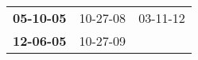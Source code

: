 \begin{supertabular}{p{0.33\columnwidth}p{0.33\columnwidth}p{0.33\columnwidth}}
 \textbf{05-10-05\textsuperscript{}} &  10-27-08\textsuperscript{} &  03-11-12\textsuperscript{} \\
 \textbf{12-06-05\textsuperscript{}} &  10-27-09\textsuperscript{} &                             \\
\end{supertabular}
